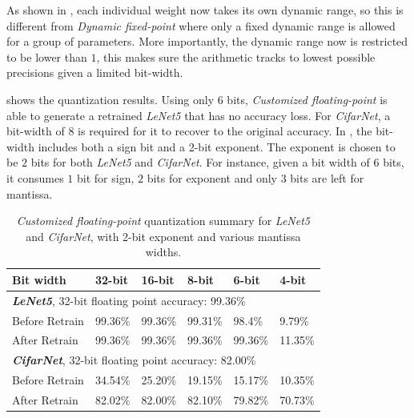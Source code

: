 \documentclass[a4paper,12pt]{report}
\begin{document}
As shown in , each individual weight now takes its own
dynamic range, so this is different from \textit{Dynamic fixed-point} where
only a fixed dynamic range is allowed for a group of parameters.
More importantly, the dynamic range now is restricted to be lower than $1$,
this makes sure the arithmetic tracks to lowest possible precisions given
a limited bit-width.

 shows the quantization results.
Using only 6 bits, \textit{Customized floating-point} is able to generate a retrained
\textit{LeNet5} that has no accuracy loss.
For \textit{CifarNet}, a bit-width of $8$ is required for it to recover
to the original accuracy.
In , the bit-width includes both a sign bit and a 2-bit exponent.
The exponent is chosen to be $2$ bits for both \textit{LeNet5} and \textit{CifarNet}.
For instance, given a bit width of $6$ bits, it consumes $1$ bit for sign, $2$
bits for exponent and only $3$ bits are left for mantissa.

\begin{table}[!h]
  \centering
  \begin{tabular}{llllll}
    \hline
    \hline
    Bit width               &32-bit     &16-bit     &8-bit     &6-bit      &4-bit    \\
    \hline
    \multicolumn{5}{l}{\textbf{\textit{LeNet5}}, 32-bit floating point accuracy: 99.36\%}\\
    \hline
    \hline
    Before Retrain          &99.36\%    &99.36\%    &99.31\%  &98.4\%      &9.79\%\\
    After Retrain           &99.36\%    &99.36\%    &99.36\%  &99.36\%     &11.35\%\\
    \hline
    \hline
    \multicolumn{5}{l}{\textbf{\textit{CifarNet}}, 32-bit floating point accuracy: 82.00\%}\\
    \hline
    Before Retrain          &34.54\%    &25.20\%  &19.15\%  &15.17\%       &10.35\%\\
    After Retrain           &82.02\%    &82.00\%  &82.10\%  &79.82\%       &70.73\%\\
    \hline
    \hline
  \end{tabular}
  \caption{\textit{Customized floating-point} quantization summary for \textit{LeNet5} and \textit{CifarNet}, with 2-bit exponent and various mantissa widths.}
  \label{tab:cfp_sum}
\end{table}
\end{document}
